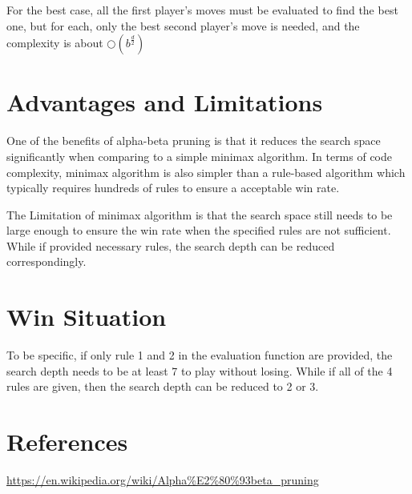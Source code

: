 \documentclass[titlepage]{article}
\begin{document}
For the best case, all the first player's moves must be evaluated to find the
best one, but for each, only the best second player's move is needed, and the
complexity is about \(\bigcirc(b^{\frac{d}{2}})\)

\section{Advantages and Limitations}
\label{sec:org9b091a7}
One of the benefits of alpha-beta pruning is that it reduces the search space
significantly when comparing to a simple minimax algorithm. In terms of code
complexity, minimax algorithm is also simpler than a rule-based algorithm which
typically requires hundreds of rules to ensure a acceptable win rate.

The Limitation of minimax algorithm is that the search space still needs to be
large enough to ensure the win rate when the specified rules are not
sufficient. While if provided necessary rules, the search depth can be reduced
correspondingly.

\section{Win Situation}
\label{sec:org02861d6}
To be specific, if only rule 1 and 2 in the evaluation function are provided,
the search depth needs to be at least 7 to play without losing. While if all
of the 4 rules are given, then the search depth can be reduced to 2 or 3.

\section{References}
\label{sec:org6741b8a}
\url{https://en.wikipedia.org/wiki/Alpha\%E2\%80\%93beta\_pruning}

\newpage
\end{document}
